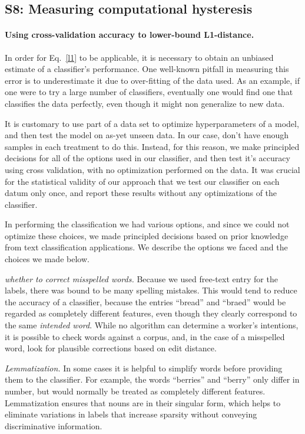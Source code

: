 \documentclass[12pt]{article}
\begin{document}
\subsection*{S8: Measuring computational hysteresis}
	\paragraph{Using cross-validation accuracy to lower-bound L1-distance.}
	In order for Eq.~\ref{l1} to be applicable, it is necessary to obtain
	an unbiased estimate of a classifier's performance.  One well-known
	pitfall in measuring this error is to underestimate it due to 
	over-fitting of the data used.  As an example, if one were to try 
	a large number of classifiers, eventually one would find one that
	classifies the data perfectly, even though it might non generalize to
	new data.

	It is customary to use part of a data set to optimize hyperparameters of
	a model, and then test the model on as-yet unseen data.  In our case,
	don't have enough samples in each treatment to do this.  Instead, for 
	this reason, we make principled decisions for all of the options used
	in our classifier, and then test it's accuracy using cross validation,
	with no optimization performed on the data.  It was crucial for 
	the statistical validity of our approach that we test our classifier on 
	each datum only once, and report these results without any optimizations
	of the classifier.

	In performing the classification we had various options, and since we
	could not optimize these choices, we made principled decisions based on
	prior knowledge from text classification applications.  We describe the
	options we faced and the choices we made below.

	\textit{whether to correct misspelled words.}  Because we used free-text
	entry for the labels, there was bound to be many spelling mistakes.
	This would tend to reduce the accuracy of a classifier, because the 
	entries ``bread'' and ``braed'' would be regarded as completely different
	features, even though they clearly correspond to the same 
	\textit{intended word}.  While no algorithm can determine a worker's 
	intentions, it is possible to check words against a corpus, and, in the
	case of a misspelled word, look for plausible corrections based on 
	edit distance.

	\textit{Lemmatization.}  In some cases it is helpful to simplify words 
	before providing them to the classifier.  For example, the words 
	``berries'' and ``berry'' only differ in number, but would normally be
	treated as completely different features.  Lemmatization ensures that
	nouns are in their singular form, which helps to eliminate variations in
	labels that increase sparsity without conveying discriminative 
	information.
\end{document}
